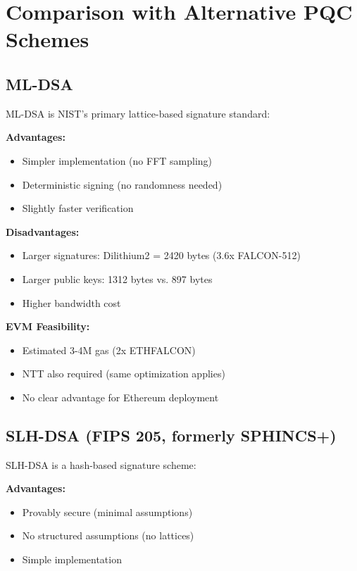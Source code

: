 \section{Comparison with Alternative PQC Schemes}


\subsection{ML-DSA}

ML-DSA \cite{ducas2018crystals} is NIST's primary lattice-based signature standard:

\textbf{Advantages:}
\begin{itemize}
    \item Simpler implementation (no FFT sampling)
    \item Deterministic signing (no randomness needed)
    \item Slightly faster verification
\end{itemize}

\textbf{Disadvantages:}
\begin{itemize}
    \item Larger signatures: Dilithium2 = 2420 bytes (3.6x FALCON-512)
    \item Larger public keys: 1312 bytes vs. 897 bytes
    \item Higher bandwidth cost
\end{itemize}

\textbf{EVM Feasibility:}
\begin{itemize}
    \item Estimated 3-4M gas (2x ETHFALCON)
    \item NTT also required (same optimization applies)
    \item No clear advantage for Ethereum deployment
\end{itemize}

\subsection{SLH-DSA (FIPS 205, formerly SPHINCS+)}

SLH-DSA \cite{bernstein2019sphincs} is a hash-based signature scheme:

\textbf{Advantages:}
\begin{itemize}
    \item Provably secure (minimal assumptions)
    \item No structured assumptions (no lattices)
    \item Simple implementation
\end{itemize}

